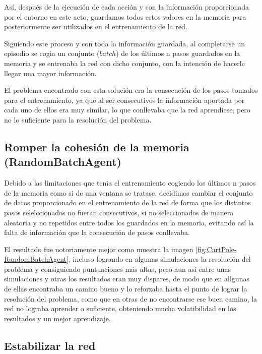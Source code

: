 Así, después de la ejecución de cada acción y con la información proporcionada por el entorno en este acto, guardamos todos estos valores en la memoria para posteriormente ser utilizados en el entrenamiento de la red.

Siguiendo este proceso y con toda la información guardada, al completarse un episodio se cogia un conjunto ($batch$) de los últimos n pasos guardados en la memoria y se entrenaba la red con dicho conjunto, con la intención de hacerle llegar una mayor información.

El problema encontrado con esta solución era la consecución de los pasos tomados para el entrenamiento, ya que al ser consecutivos la información aportada por cada uno de ellos era muy similar, lo que conllevaba que la red aprendiese, pero no lo suficiente para la resolución del problema.

\subsection{Romper la cohesión de la memoria (RandomBatchAgent)}

Debido a las limitaciones que tenia el entrenamiento cogiendo los últimos n pasos de la memoria como si de una ventana se tratase, decidimos cambiar el conjunto de datos proporcionado en el entrenamiento de la red de forma que los distintos pasos selelccionados no fueran consecutivos, si no seleccionados de manera aleatoria y no repetidos entre todos los guardados en la memoria, evitando así la falta de información que la consecución de pasos conllevaba.

El resultado fue notoriamente mejor como muestra la imagen \ref{fig:CartPole-RandomBatchAgent}, incluso logrando en algunas simulaciones la resolución del problema y consiguiendo puntuaciones más altas, pero aun así entre unas simulaciones y otras los resultados eran muy dispares, de modo que en allgunas de ellas encontraba un camino bueno y lo reforzaba hasta el punto de lograr la resolución del problema, como que en otras de no encontrarse ese buen camino, la red no lograba aprender o suficiente, obteniendo mucha volatibilidad en los resultados y un mejor aprendizaje.


\subsection{Estabilizar la red}

